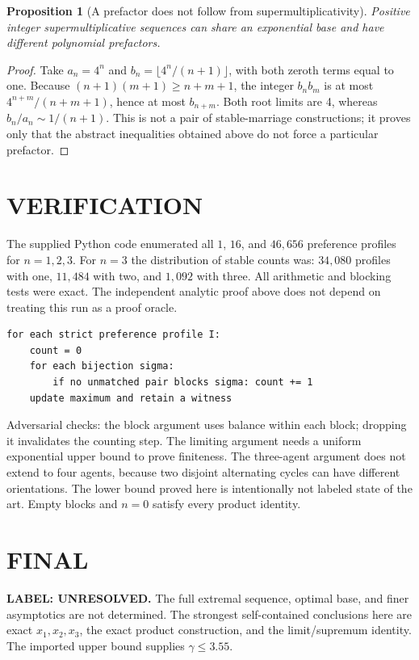 \documentclass[11pt,a4paper]{article}
\newtheorem{proposition}[theorem]{Proposition}
\theoremstyle{remark}\newtheorem{remark}[theorem]{Remark}
\begin{document}
\begin{proposition}[A prefactor does not follow from supermultiplicativity]
Positive integer supermultiplicative sequences can share an exponential base and have different polynomial prefactors.
\end{proposition}
\begin{proof}
Take $a_n=4^n$ and $b_n=\lfloor4^n/(n+1)\rfloor$, with both zeroth terms equal to one. Because $(n+1)(m+1)\ge n+m+1$, the integer $b_nb_m$ is at most $4^{n+m}/(n+m+1)$, hence at most $b_{n+m}$. Both root limits are 4, whereas $b_n/a_n\sim1/(n+1)$. This is not a pair of stable-marriage constructions; it proves only that the abstract inequalities obtained above do not force a particular prefactor.
\end{proof}

\section{VERIFICATION}
The supplied Python code enumerated all $1$, $16$, and $46{,}656$ preference profiles for $n=1,2,3$. For $n=3$ the distribution of stable counts was: $34{,}080$ profiles with one, $11{,}484$ with two, and $1{,}092$ with three. All arithmetic and blocking tests were exact. The independent analytic proof above does not depend on treating this run as a proof oracle.
\begin{lstlisting}
for each strict preference profile I:
    count = 0
    for each bijection sigma:
        if no unmatched pair blocks sigma: count += 1
    update maximum and retain a witness
\end{lstlisting}
Adversarial checks: the block argument uses balance within each block; dropping it invalidates the counting step. The limiting argument needs a uniform exponential upper bound to prove finiteness. The three-agent argument does not extend to four agents, because two disjoint alternating cycles can have different orientations. The lower bound proved here is intentionally not labeled state of the art. Empty blocks and $n=0$ satisfy every product identity.

\section{FINAL}
\textbf{LABEL: UNRESOLVED.}
The full extremal sequence, optimal base, and finer asymptotics are not determined. The strongest self-contained conclusions here are exact $x_1,x_2,x_3$, the exact product construction, and the limit/supremum identity. The imported upper bound supplies $\gamma\le3.55$.
\end{document}
